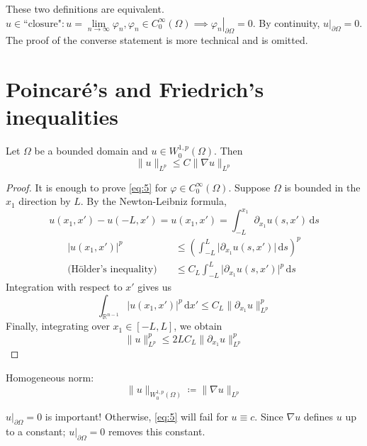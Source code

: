 \documentclass{report}
\begin{document}
\mlemma{}
{
    These two definitions are equivalent. \(u \in \text{``closure"} \colon u = \lim\limits_{n \to \infty} \varphi_{n}, \varphi_{n} \in C^{\infty}_{0}(\Omega) \implies \left. \varphi_{n} \right|_{\partial \Omega} = 0\). By continuity, \(\left. u \right|_{\partial \Omega} = 0\). The proof of the converse statement is more technical and is omitted.
}

\section{Poincaré's and Friedrich's inequalities}
{
    Let \(\Omega\) be a bounded domain and \(u \in W^{1, p}_{0}(\Omega)\). Then
    \begin{equation}\label{eq:5}
        \|u\|_{L^{p}} \leq C \|\nabla u\|_{L^{p}} 
    \end{equation}
}

\begin{proof}
    It is enough to prove \ref{eq:5} for \(\varphi \in C^{\infty}_{0}(\Omega)\). Suppose \(\Omega\) is bounded in the \(x_{1}\) direction by \(L\). By the Newton-Leibniz formula,
    \[    
        u(x_1, x') - u(-L, x') = u(x_1, x') = \int_{-L}^{x_1} \partial_{x_1}u(s, x') \,\mathrm{d}s 
    \]
    \begin{align*}
        \vert u(x_1, x') \vert ^{p} &\leq \left(\int_{-L}^{L} \vert \partial_{x_1}u(s, x') \vert \,\mathrm{d}s \right)^{p} \\
        \text{(Hölder's inequality)} \quad & \leq C_{L} \int_{-L}^{L} \vert \partial_{x_1}u(s, x') \vert^{p} \,\mathrm{d}s
    \end{align*}
    Integration with respect to $x'$ gives us
    \[
        \int_{\mathbb{R}^{n-1}} \vert u(x_1, x') \vert ^{p} \,\mathrm{d}x' \leq C_{L}\|\partial_{x_1}u\|_{L^{p}}^{p}
    \]
    Finally, integrating over \(x_1 \in [-L, L]\), we obtain
    \[
        \|u\|_{L^{p}}^{p} \leq 2LC_{L} \|\partial_{x_1}u\|_{L^{p}}^{p}
    \]
\end{proof}

{
    Homogeneous norm:
    \[
        \|u\|_{W^{1, p}_{0}(\Omega)} \coloneqq \|\nabla u\|_{L^{p}}
    \]
}

\begin{note}
    \(\left. u \right|_{\partial \Omega} = 0\) is important! Otherwise, \ref{eq:5} will fail for \(u \equiv c\). Since \(\nabla u\) defines \(u\) up to a constant; \(\left. u \right|_{\partial \Omega} = 0\) removes this constant.
\end{note}
\end{document}
